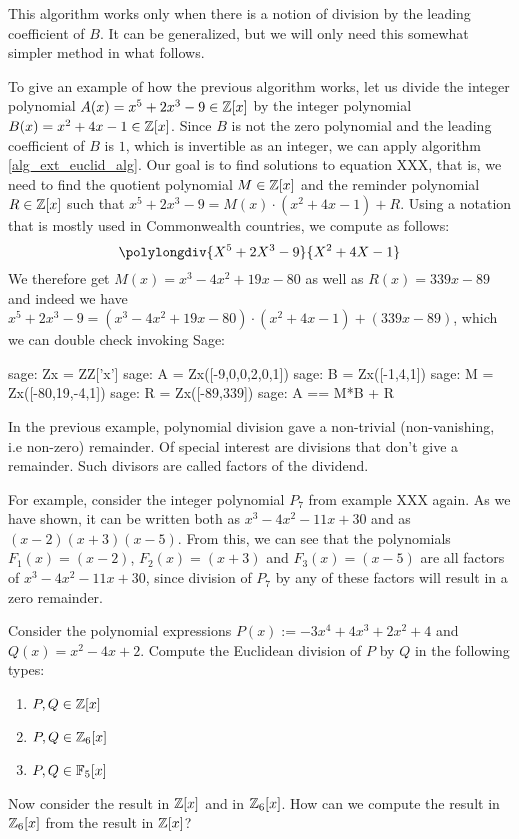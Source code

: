 This algorithm works only when there is a notion of division by the leading coefficient of $B$. It can be generalized, but we will only need this somewhat simpler method in what follows.
\begin{example} To give an example of how the previous algorithm works, let us divide the integer polynomial $A(x)=x^5+2x^3-9\in \mathbb{Z}[x]$ by the integer polynomial $B(x)=x^2+4x-1\in\mathbb{Z}[x]$. Since $B$ is not the zero polynomial and the leading coefficient of $B$ is $1$, which is invertible as an integer, we can apply algorithm \ref{alg_ext_euclid_alg}. Our goal is to find solutions to equation XXX, that is, we need to find the quotient polynomial $M\in\mathbb{Z}[x]$ and the reminder polynomial $R \in \mathbb{Z}[x]$ such that $x^5+2x^3-9 = M(x)\cdot (x^2+4x-1) + R$. Using a notation that is mostly used in Commonwealth countries, we compute as follows:
\begin{equation}
\polylongdiv{X^5+2X^3-9}{X^2+4X-1}
\end{equation}
We therefore get $M(x)=x^3-4x^2+19x-80$ as well as $R(x)=339x-89$ and indeed we have $x^5+2x^3-9 = (x^3-4x^2+19x-80)\cdot (x^2+4x-1) + (339x-89)$, which we can double check invoking Sage:
\begin{sagecommandline}
sage: Zx = ZZ['x']
sage: A = Zx([-9,0,0,2,0,1])
sage: B = Zx([-1,4,1])
sage: M = Zx([-80,19,-4,1])
sage: R = Zx([-89,339])
sage: A == M*B + R
\end{sagecommandline}
\end{example}
\begin{example} In the previous example, polynomial division gave a non-trivial (non-vanishing, i.e non-zero) remainder. Of special interest are divisions that don't give a remainder. Such divisors are called factors of the dividend. 

For example, consider the integer polynomial $P_7$ from example XXX again. As we have shown, it can be written both as $x^3 - 4 x^2 - 11 x + 30$ and as $(x-2)(x + 3)(x-5)$. From this, we can see that the polynomials $F_1(x)=(x-2)$, $F_2(x)=(x+3)$ and $F_3(x)=(x-5)$ are all factors of $x^3 - 4 x^2 - 11 x + 30$, since division of $P_7$ by any of these factors will result in a zero remainder.
\end{example}
\begin{exercise} Consider the polynomial expressions $P(x):= -3x^4 + 4x^3 + 2x^2 +4$ and $Q(x)= x^2-4x+2$. Compute the Euclidean division of $P$ by $Q$ in the following types:
\begin{enumerate}
\item $P,Q\in \mathbb{Z}[x]$
\item $P,Q\in \mathbb{Z}_6[x]$
\item $P,Q\in \mathbb{F}_5[x]$
\end{enumerate}
Now consider the result in $\mathbb{Z}[x]$ and in $\mathbb{Z}_6[x]$. How can we compute the result in $\mathbb{Z}_6[x]$ from the result in $\mathbb{Z}[x]$?
\end{exercise}
